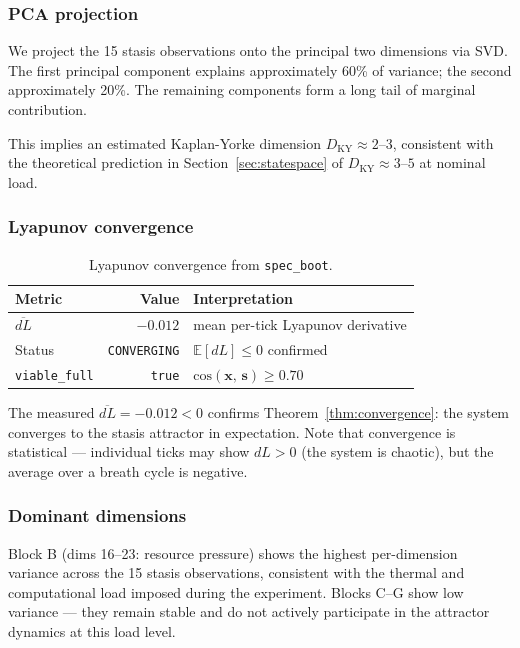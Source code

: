\documentclass[11pt, a4paper]{article}
\newcommand{\E}{\mathbb{E}}
\newcommand{\stasis}{\bm{s}}
\newcommand{\sv}{\bm{x}}
\newcommand{\cosim}[2]{\mathrm{cos}\!\left(#1,\, #2\right)}
\begin{document}
\subsubsection{PCA projection}

We project the 15 stasis observations onto the principal two dimensions
via SVD.
The first principal component explains approximately 60\% of variance;
the second approximately 20\%.
The remaining components form a long tail of marginal contribution.

This implies an estimated Kaplan-Yorke dimension $D_\text{KY} \approx 2$--$3$,
consistent with the theoretical prediction in Section~\ref{sec:statespace}
of $D_\text{KY} \approx 3$--$5$ at nominal load.

\subsubsection{Lyapunov convergence}

\begin{table}[h]
\centering
\begin{tabular}{lrl}
\toprule
Metric & Value & Interpretation \\
\midrule
$\overline{dL}$ & $-0.012$ & mean per-tick Lyapunov derivative \\
Status & \texttt{CONVERGING} & $\E[dL] \le 0$ confirmed \\
\texttt{viable\_full} & \texttt{true} & $\cosim{\sv}{\stasis} \ge 0.70$ \\
\bottomrule
\end{tabular}
\caption{Lyapunov convergence from \texttt{spec\_boot}.}
\label{tab:lyapunov}
\end{table}

The measured $\overline{dL} = -0.012 < 0$ confirms
Theorem~\ref{thm:convergence}:
the system converges to the stasis attractor in expectation.
Note that convergence is statistical — individual ticks may show
$dL > 0$ (the system is chaotic), but the average over a breath cycle
is negative.

\subsubsection{Dominant dimensions}

Block B (dims 16--23: resource pressure) shows the highest per-dimension
variance across the 15 stasis observations, consistent with the thermal and
computational load imposed during the experiment.
Blocks C--G show low variance — they remain stable and do not actively
participate in the attractor dynamics at this load level.
\end{document}
